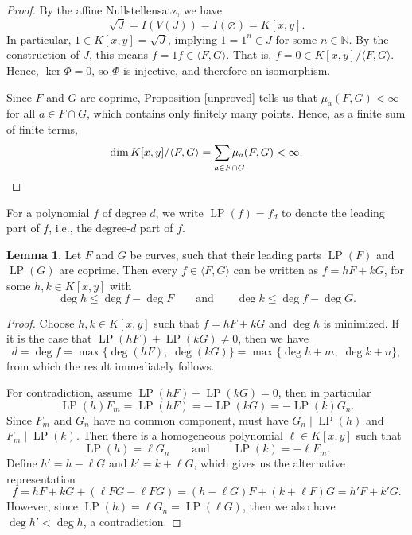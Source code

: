 \documentclass[12pt]{article}
\makeatletter
\newenvironment{fullbox}{\begin{lrbox}{\savefullbox}\begin{minipage}{\dimexpr\textwidth-2\fboxsep\relax}}{\end{minipage}\end{lrbox}\begin{center}\framebox[\textwidth]{\usebox{\savefullbox}}\end{center}}
\theoremstyle{definition}
\newtheorem{lemma}[theorem]{Lemma}
\newenvironment{blemma}{\begin{fullbox}\begin{lemma}}{\end{lemma}\end{fullbox}}
\newcommand{\isp}[1]{\qquad\text{#1}\qquad}
\newcommand{\N}{\mathbb{N}}
\renewcommand{\emptyset}{\varnothing}
\newcommand{\<}{\langle}
\renewcommand{\>}{\rangle}
\newcommand{\longlimit}[2]{
    {
        \def\arraystretch{0}
        \begin{array}[t]{@{}l@{}}
            \displaystyle{#2} \\[8.5pt] \scriptstyle{#1}
        \end{array}
    }
}
\newcommand{\longsum}[2]{\longlimit{#1}{\sum #2}}
\DeclareMathOperator{\LP}{LP}
\makeatother
\begin{document}
\begin{proof}
    By the affine Nullstellensatz, we have
    \[
        \sqrt{J} = I(V(J)) = I(\emptyset) = K[x, y].
    \]
    In particular, $1 \in K[x, y] = \sqrt{J}$, implying $1 = 1^n \in J$ for some $n \in \N$. By the construction of $J$, this means $f = 1f \in \<F, G\>$. That is, $f = 0 \in K[x, y] / \<F, G\>$. Hence, $\ker \Phi = 0$, so $\Phi$ is injective, and therefore an isomorphism.

    Since $F$ and $G$ are coprime, Proposition \ref{unproved} tells us that $\mu_a(F, G) < \infty$ for all $a \in F \cap G$, which contains only finitely many points. Hence, as a finite sum of finite terms,
    \[
        \dim K[x, y] / \<F, G\> = \longsum{a \in F \cap G}{\mu_a(F, G)} < \infty.
    \]

\end{proof}



\newpage

For a polynomial $f$ of degree $d$, we write $\LP(f) = f_d$ to denote the leading part of $f$, i.e., the degree-$d$ part of $f$.

\begin{blemma}\label{LT-coprime-rep}
    Let $F$ and $G$ be curves, such that their leading parts $\LP(F)$ and $\LP(G)$ are coprime. Then every $f \in \<F, G\>$ can be written as $f = hF + kG$, for some $h, k \in K[x, y]$ with
    \[
        \deg h \leq \deg f - \deg F \isp{and} \deg k \leq \deg f - \deg G.
    \]
\end{blemma}



\begin{proof}
    Choose $h, k \in K[x, y]$ such that $f = hF + kG$ and $\deg h$ is minimized. If it is the case that $\LP(hF) + \LP(kG) \ne 0$, then we  have
    \[
        d 
            = \deg f
            = \max\{\deg(hF),\; \deg(kG)\}
            = \max\{\deg h + m,\; \deg k + n\},
    \]
    from which the result immediately follows.

    For contradiction, assume $\LP(hF) + \LP(kG) = 0$, then in particular
    \[
        \LP(h) F_m = \LP(hF) = -\LP(kG) = -\LP(k)G_n.
    \]
    Since $F_m$ and $G_n$ have no common component, must have $G_n \mid \LP(h)$ and $F_m \mid \LP(k)$. Then there is a homogeneous polynomial $\ell \in K[x, y]$ such that
    \[
        \LP(h) = \ell G_n \isp{and} \LP(k) = -\ell F_m.
    \]
    Define $h' = h - \ell G$ and $k' = k + \ell G$, which gives us the alternative representation
    \[
        f
            = hF + kG + (\ell FG - \ell FG)
            = (h - \ell G)F + (k + \ell F)G
            = h'F + k'G.
    \]
    However, since $\LP(h) = \ell G_n = \LP(\ell G)$, then we also have $\deg h' < \deg h$, a contradiction.

\end{proof}
\end{document}
